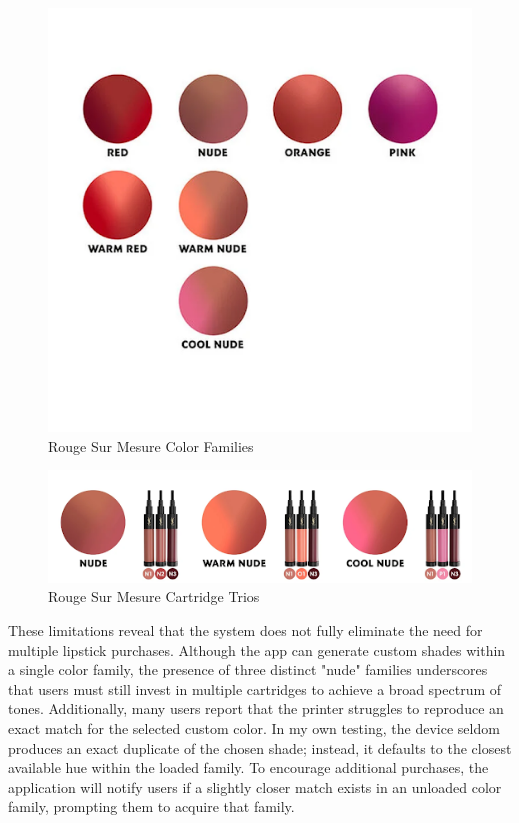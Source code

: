 \begin{figure}[H]
	\centering
	\includegraphics[scale=.5]{colorfamilies}
	\caption{Rouge Sur Mesure Color Families}
	\label{fig:colorfamilies}
\end{figure}

\begin{figure}[H]
	\centering
	\includegraphics[scale=.5]{cartridges}
	\caption{Rouge Sur Mesure Cartridge Trios}
	\label{fig:cartridges}
\end{figure}


These limitations reveal that the system does not fully eliminate the need for multiple lipstick purchases. Although the app can generate custom shades within a single color family, the presence of three distinct "nude" families underscores that users must still invest in multiple cartridges to achieve a broad spectrum of tones. Additionally, many users report that the printer struggles to reproduce an exact match for the selected custom color. In my own testing, the device seldom produces an exact duplicate of the chosen shade; instead, it defaults to the closest available hue within the loaded family. To encourage additional purchases, the application will notify users if a slightly closer match exists in an unloaded color family, prompting them to acquire that family.

